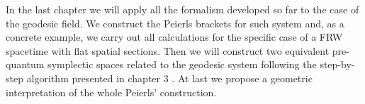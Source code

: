 \documentclass[Main]{subfiles}
\begin{document}
In the last chapter we will apply all the formalism developed so far to the case of the geodesic field.
We construct the Peierls brackets for such system and, as a  concrete example, we carry out all calculations for the specific case of a FRW spacetime with flat spatial sections.
Then we will construct two equivalent pre-quantum symplectic spaces related to the geodesic system following the step-by-step algorithm presented in chapter 3 .
At last we propose a geometric interpretation of the whole Peierls' construction.
\end{document}
